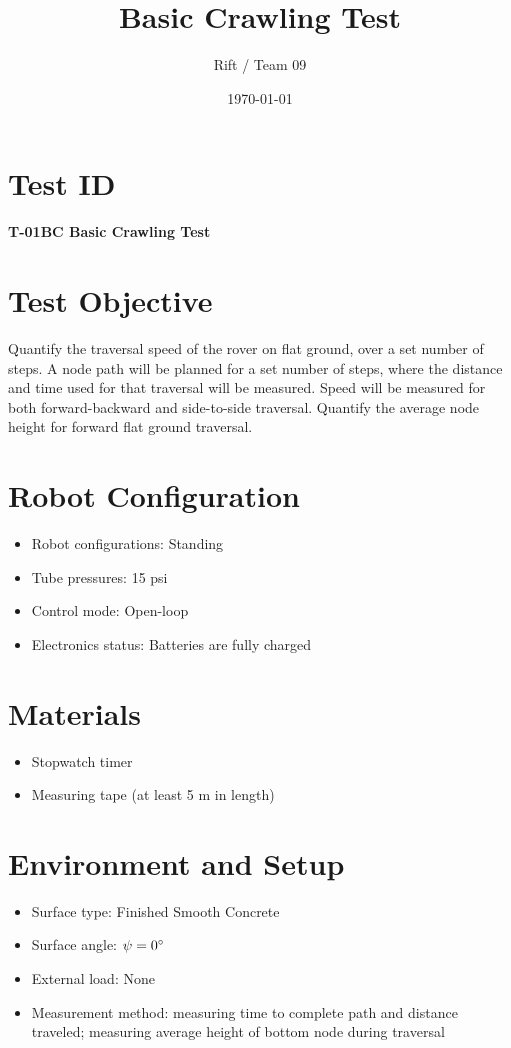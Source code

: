 \documentclass[11pt]{article}
\title{Basic Crawling Test}
\author{Rift / Team 09}
\date{\today}
\begin{document}
\maketitle

\section*{Test ID}
\textbf{T-01BC Basic Crawling Test}

\section*{Test Objective}
Quantify the traversal speed of the rover on flat ground, over a set number of steps. A node path will be planned for a set number of steps, where the distance and time used for that traversal will be measured.  Speed will be measured for both forward-backward and side-to-side traversal. Quantify the average node height for forward flat ground traversal.

\section*{Robot Configuration}
\begin{itemize}[noitemsep]
    \item Robot configurations: Standing
    \item Tube pressures: 15 psi
    \item Control mode: Open-loop
    \item Electronics status: Batteries are fully charged
\end{itemize}

\section*{Materials}
\begin{itemize}[noitemsep]
    \item Stopwatch timer
    \item Measuring tape (at least 5 m in length)
    
\end{itemize}

\section*{Environment and Setup}
\begin{itemize}[noitemsep]
    \item Surface type: Finished Smooth Concrete
    \item Surface angle: $\psi = 0 {\degree}$ 
    \item External load: None 
    \item Measurement method: measuring time to complete path and distance traveled; measuring average height of bottom node during traversal
\end{itemize}
\end{document}
